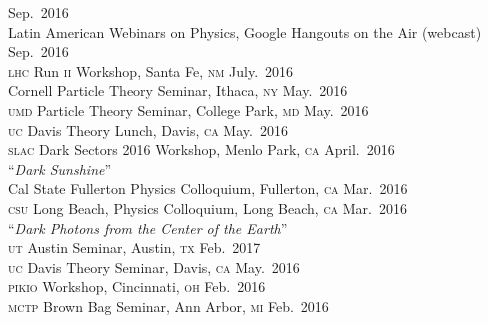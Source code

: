 \documentclass[margin,line]{resume}
\newcommand{\mytalksep}{-.1mm}
\newcommand{\mytalkskip}{2mm}
\newcommand{\scap}[1]{\textsc{\MakeLowercase{#1}}}
\begin{document}
\begin{resume}
\hfill %
Sep.~2016\vspace{\mytalksep}\\ 
%
Latin American Webinars on Physics,
Google Hangouts on the Air (webcast)
\hfill %
Sep.~2016\vspace{\mytalksep}\\ 
%
\scap{LHC} Run \scap{II} Workshop, 
Santa Fe, \scap{NM}
\hfill %
July.~2016\vspace{\mytalksep}\\ 
%
Cornell Particle Theory Seminar, 
Ithaca, \scap{NY}
\hfill %
May.~2016\vspace{\mytalksep}\\ 
%
\scap{UMD} Particle Theory Seminar, 
College Park, \scap{MD}
\hfill %
May.~2016\vspace{\mytalksep}\\ 
%
\scap{UC} Davis
Theory Lunch, Davis, \scap{CA}
\hfill %
May.~2016\vspace{\mytalksep}\\ 
%
\scap{SLAC} 
Dark Sectors 2016 Workshop, Menlo Park, \scap{CA}
\hfill %
April.~2016\vspace{\mytalkskip}\\   
%
%
%
%
``\emph{Dark Sunshine}''
\vspace{\mytalksep}\\ 
Cal State Fullerton
Physics Colloquium, Fullerton, \scap{CA}
\hfill %
Mar.~2016\vspace{\mytalksep}\\   
%
\scap{CSU} Long Beach,
Physics Colloquium,
Long Beach, \scap{CA}
\hfill %
Mar.~2016\vspace{\mytalkskip}\\
%
%
%
%
``\emph{Dark Photons from the Center of the Earth}''
\vspace{\mytalksep}\\ 
\scap{UT} Austin
Seminar, Austin, \scap{TX}
\hfill %
Feb.~2017\vspace{\mytalksep}\\ 
%
\scap{UC} Davis
Theory Seminar, Davis, \scap{CA}
\hfill %
May.~2016\vspace{\mytalksep}\\ 
%
\scap{PIKIO} 
Workshop, Cincinnati, \scap{OH}
\hfill %
Feb.~2016\vspace{\mytalksep}\\   
%
\scap{MCTP} 
Brown Bag Seminar, Ann Arbor, \scap{MI}
\hfill %
Feb.~2016\vspace{\mytalksep}\\   
%

\end{resume}
\end{document}
